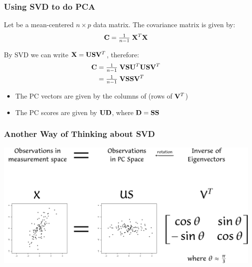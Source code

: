 \documentclass{beamer}
\begin{document}
\begin{frame}[fragile]
  \frametitle{Using SVD to do PCA}

Let  be a mean-centered $n \times p$ data matrix. The covariance matrix is given by:
\begin{align*}
  \mathbf{C} = \tfrac{1}{n-1} \; \mathbf{X}^T \mathbf{X}
\end{align*}

By SVD we can write $\mathbf{X} = \mathbf{U}\mathbf{S}\mathbf{V}^T$, therefore:
\begin{align*}
  \mathbf{C} &= \tfrac{1}{n-1} \; \mathbf{V}\mathbf{S}\mathbf{U}^T \mathbf{U}\mathbf{S}\mathbf{V}^T \\
          &= \tfrac{1}{n-1} \; \mathbf{V} \mathbf{S}\mathbf{S} \mathbf{V}^T
\end{align*}

\begin{itemize}
  \item The PC vectors are given by the columns of  (rows of $\mathbf{V}^T$)
  \item The PC scores are given by $\mathbf{U}\mathbf{D}$, where $\mathbf{D} = \mathbf{S}\mathbf{S}$
\end{itemize}

\end{frame}




\begin{frame}
  \frametitle{Another Way of Thinking about SVD}


\begin{center}
\includegraphics[width=\textwidth]{fig-svdpca}
\end{center}

\end{frame}

\end{document}
